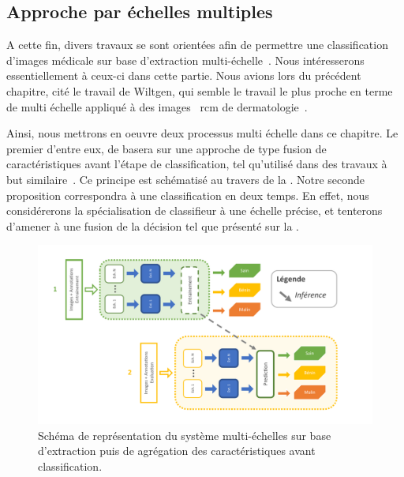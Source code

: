 \subsection{Approche par échelles multiples}


A cette fin, divers travaux se sont orientées afin de permettre une classification d'images médicale sur base d'extraction multi-échelle~\cite{Alsaih2016,Tzalavra2016}. Nous intéresserons essentiellement à ceux-ci dans cette partie. Nous avions lors du précédent chapitre, cité le travail de Wiltgen, qui semble le travail le plus proche en terme de multi échelle appliqué à des images ~\gls{rcm} de dermatologie~\cite{Wiltgen2008}.\par

Ainsi, nous mettrons en oeuvre deux processus multi échelle dans ce chapitre. Le premier d'entre eux, de basera sur une approche de type fusion de caractéristiques avant l'étape de classification, tel qu'utilisé dans des travaux à but similaire~\cite{Pedersoli2011,Alsaih2016}. Ce principe est schématisé au travers de la . Notre seconde proposition correspondra à une classification en deux temps. En effet, nous considérerons la spécialisation de classifieur à une échelle précise, et tenterons d'amener à une fusion de la décision tel que présenté sur la .\par

\begin{figure}[H]
    \centering
    \includegraphics[width=\linewidth]{contents/chapter_5/resources/scheme_multiscale_features.pdf}
    \caption{Schéma de représentation du système multi-échelles sur base d'extraction puis de agrégation des caractéristiques avant classification.}
    \label{fig:scheme_multiscale_features}
\end{figure}\par




